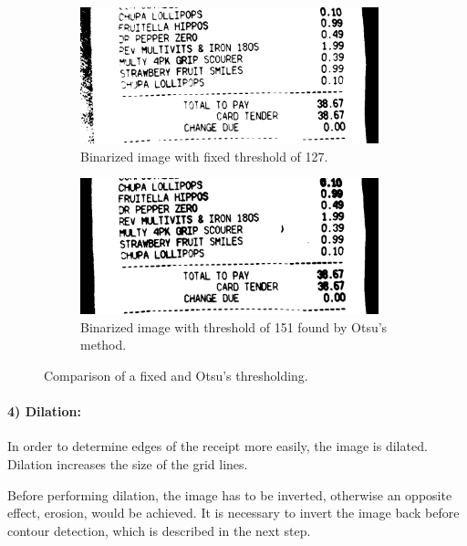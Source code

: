 \documentclass[
  digital, %
  table,   %
  oneside, %
  lof,     %
  lot,     %
]{fithesis3}
\newcommand\half{0.45}
\newcommand\subfigsize{0.95}
\begin{document}
\begin{figure}
    \centering
    \begin{subfigure}[t]{\half\textwidth}
      \centering
      \includegraphics[width=\subfigsize\textwidth]{figures/image_processing/binary_threshold}
      \caption{Binarized image with fixed threshold of 127.}
      \label{fig:binary_threshold}
    \end{subfigure}
    \begin{subfigure}[t]{\half\textwidth}
      \centering
      \includegraphics[width=\subfigsize\textwidth]{figures/image_processing/otsu_threshold}
      \caption{Binarized image with threshold of 151 found by Otsu's method.}
      \label{fig:otsu_threshold}
    \end{subfigure}
    \caption{Comparison of a fixed and Otsu's thresholding.}
    \label{fig:threshold_comparison}
\end{figure}

\paragraph{4) Dilation:} In order to determine edges of the receipt more easily, the image is dilated. Dilation increases the size of the grid lines.

Before performing dilation, the image has to be inverted, otherwise an opposite effect, erosion, would be achieved. It is necessary to invert the image back before contour detection, which is described in the next step. 
\end{document}
